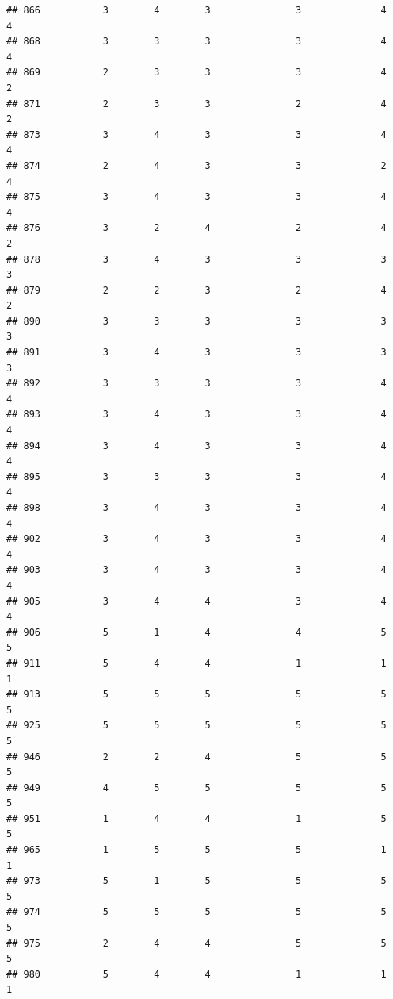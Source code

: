 \documentclass[
]{article}
\begin{document}
\begin{verbatim}
## 866           3        4        3               3              4             4
## 868           3        3        3               3              4             4
## 869           2        3        3               3              4             2
## 871           2        3        3               2              4             2
## 873           3        4        3               3              4             4
## 874           2        4        3               3              2             4
## 875           3        4        3               3              4             4
## 876           3        2        4               2              4             2
## 878           3        4        3               3              3             3
## 879           2        2        3               2              4             2
## 890           3        3        3               3              3             3
## 891           3        4        3               3              3             3
## 892           3        3        3               3              4             4
## 893           3        4        3               3              4             4
## 894           3        4        3               3              4             4
## 895           3        3        3               3              4             4
## 898           3        4        3               3              4             4
## 902           3        4        3               3              4             4
## 903           3        4        3               3              4             4
## 905           3        4        4               3              4             4
## 906           5        1        4               4              5             5
## 911           5        4        4               1              1             1
## 913           5        5        5               5              5             5
## 925           5        5        5               5              5             5
## 946           2        2        4               5              5             5
## 949           4        5        5               5              5             5
## 951           1        4        4               1              5             5
## 965           1        5        5               5              1             1
## 973           5        1        5               5              5             5
## 974           5        5        5               5              5             5
## 975           2        4        4               5              5             5
## 980           5        4        4               1              1             1

\end{verbatim}
\end{document}
